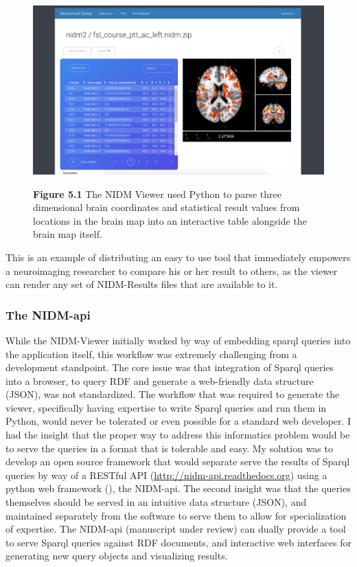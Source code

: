\documentclass{report}
\begin{document}
\begin{figure}[ht!]
\begin{center}
\includegraphics[width=15cm]{images/figure51.png}
\end{center}
 \textbf{\label{fig:51} Figure 5.1 }{ The NIDM Viewer used Python to parse three dimensional brain
coordinates and statistical result values from locations in the brain
map into an interactive table alongside the brain map itself.
}
\end{figure}

This is an example of distributing an easy to use tool that immediately
empowers a neuroimaging researcher to compare his or her result to
others, as the viewer can render any set of NIDM-Results files that are
available to it.

\subsubsection{The NIDM-api}

While the NIDM-Viewer initially worked by way of embedding sparql
queries into the application itself, this workflow was extremely
challenging from a development standpoint. The core issue was that
integration of Sparql queries into a browser, to query RDF and generate
a web-friendly data structure (JSON), was not standardized. The workflow
that was required to generate the viewer, specifically having expertise
to write Sparql queries and run them in Python, would never be tolerated
or even possible for a standard web developer. I had the insight that
the proper way to address this informatics problem would be to serve the
queries in a format that is tolerable and easy. My solution was to
develop an open source framework that would separate serve the results
of Sparql queries by way of a RESTful API
(\href{http://nidm-api.readthedocs.org}{http://nidm-api.readthedocs.org})
using a python web framework
(\cite{noauthor_undated-ia}),
the NIDM-api. The second insight was that the queries themselves should
be served in an intuitive data structure (JSON), and maintained
separately from the software to serve them to allow for specialization
of expertise. The NIDM-api (manuscript under review) can dually provide
a tool to serve Sparql queries against RDF documents, and interactive
web interfaces for generating new query objects and visualizing results.
\end{document}
